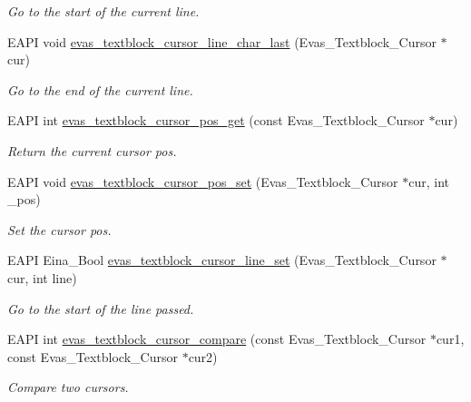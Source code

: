 \begin{DoxyCompactItemize}
\begin{DoxyCompactList}\small\item\em Go to the start of the current line. \item\end{DoxyCompactList}\item 
EAPI void \hyperlink{group__Evas__Object__Textblock_gaf96505739a5a805922f86b0e9c577afe}{evas\_\-textblock\_\-cursor\_\-line\_\-char\_\-last} (Evas\_\-Textblock\_\-Cursor $\ast$cur)
\begin{DoxyCompactList}\small\item\em Go to the end of the current line. \item\end{DoxyCompactList}\item 
EAPI int \hyperlink{group__Evas__Object__Textblock_ga7f74459b59870c258bd312ff114778bc}{evas\_\-textblock\_\-cursor\_\-pos\_\-get} (const Evas\_\-Textblock\_\-Cursor $\ast$cur)
\begin{DoxyCompactList}\small\item\em Return the current cursor pos. \item\end{DoxyCompactList}\item 
EAPI void \hyperlink{group__Evas__Object__Textblock_gacde95e638bba6858b73f316afe2cfef0}{evas\_\-textblock\_\-cursor\_\-pos\_\-set} (Evas\_\-Textblock\_\-Cursor $\ast$cur, int \_\-pos)
\begin{DoxyCompactList}\small\item\em Set the cursor pos. \item\end{DoxyCompactList}\item 
EAPI Eina\_\-Bool \hyperlink{group__Evas__Object__Textblock_gaa1992968fd64630687b18a5f9d632edf}{evas\_\-textblock\_\-cursor\_\-line\_\-set} (Evas\_\-Textblock\_\-Cursor $\ast$cur, int line)
\begin{DoxyCompactList}\small\item\em Go to the start of the line passed. \item\end{DoxyCompactList}\item 
EAPI int \hyperlink{group__Evas__Object__Textblock_ga194b0bc812a6c031bc80a195bff0a40e}{evas\_\-textblock\_\-cursor\_\-compare} (const Evas\_\-Textblock\_\-Cursor $\ast$cur1, const Evas\_\-Textblock\_\-Cursor $\ast$cur2)
\begin{DoxyCompactList}\small\item\em Compare two cursors. \item\end{DoxyCompactList}\item 

\end{DoxyCompactItemize}
